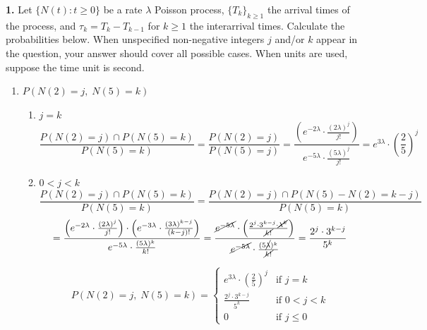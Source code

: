 \documentclass[12pt]{article}
\begin{document}


\noindent
\textbf{1.} Let $\{N(t):t\ge 0\}$ be a rate $\lambda$ Poisson process, $\{T_k\}_{k\ge 1}$ the arrival times of the process, and $\tau_k = T_k - T_{k-1}$ for $k\ge 1$ the interarrival times. Calculate the probabilities below. When unspecified non-negative integers $j$ and/or $k$ appear in the question, your answer should cover all possible cases. When units are used, suppose the time unit is second.
\begin{enumerate}[label=(\alph*)]
    \item $P(N(2) = j,\; N(5)=k)$
    \begin{enumerate}[label=(\roman*)]
    \item $j=k$
    $$
    \frac{P(N(2) = j)\cap P(N(5)=k)}{P(N(5)=k)}
    =\frac{P(N(2) = j)}{P(N(5)=j)}
    = \frac{ \left(e^{-2\lambda}\cdot \frac{(2\lambda)^j}{j!}\right)}
    {e^{-5\lambda}\cdot \frac{(5\lambda)^j}{j!}}
    = e^{3\lambda}\cdot \left(\frac{2}{5}\right)^j
    $$
    \item $0<j<k$
    $$\frac{P(N(2) = j)\cap P(N(5)=k)}{P(N(5)=k)}
    =\frac{P(N(2) = j)\cap P(N(5)-N(2)=k-j)}{P(N(5)=k)}
    $$
    $$    =\frac{
    \left(e^{-2\lambda}\cdot \frac{(2\lambda)^j}{j!}\right)\cdot \left(e^{-3\lambda}\cdot \frac{(3\lambda)^{k-j}}{(k-j)!} \right)  }    
    {e^{-5\lambda}\cdot \frac{(5\lambda)^k}{k!}}
    =\frac{\cancel{e^{-5\lambda}}\cdot \left(
    \frac{2^j\cdot 3^{k-j}\cdot \cancel{\lambda^k}}
    {\cancel{k!}}
    \right)}
    {{\cancel{e^{-5\lambda}}\cdot \frac{(5\cancel{\lambda})^k}{\cancel{k!}}}} = \frac{2^j\cdot 3^{k-j}}{5^k}    $$
    
    $$P(N(2) = j,\; N(5)=k)=
    \begin{cases}
    e^{3\lambda}\cdot \left(\frac{2}{5}\right)^j &\text{if } j= k\\
    \frac{2^j\cdot 3^{k-j}}{5^k} & \text{if } 0<j<k\\
    0 & \text{if } j\le 0
    \end{cases}
    $$
    \end{enumerate}
    

\end{enumerate}
\end{document}
